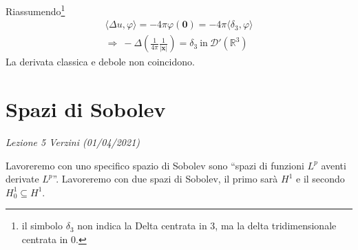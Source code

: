 \documentclass[10pt,a4paper,twoside,openright]{book}
\begin{document}
Riassumendo\footnote{il simbolo $\displaystyle \delta _{3}$ non indica la Delta centrata in $\displaystyle 3$, ma la delta tridimensionale centrata in $\displaystyle 0$.}
\begin{gather*}
	\langle \Delta u,\varphi \rangle =-4\pi \varphi (\mathbf{0}) =-4\pi \langle \delta _{3} ,\varphi \rangle \\
	\Rightarrow \ -\Delta \left(\frac{1}{4\pi }\frac{1}{| \mathbf{x}| }\right) =\delta_{3}  \ \text{in} \ \mathcal{D} '\left(\mathbb{R}^{3}\right)
\end{gather*}
La derivata classica e debole non coincidono.

\chapter{Spazi di Sobolev}
\textit{Lezione 5 Verzini (01/04/2021)}

Lavoreremo con uno specifico spazio di Sobolev sono ``spazi di funzioni $L^{p}$ aventi derivate $L^{p}$''. Lavoreremo con due spazi di Sobolev, il primo sarà $H^{1}$ e il secondo $H^{1}_{0} \subseteq H^{1}$.
\end{document}

